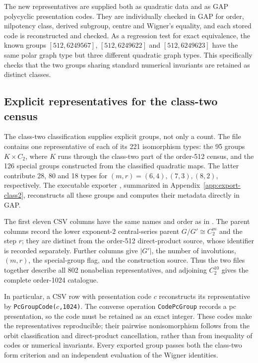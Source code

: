 \documentclass[11pt,a4paper]{amsart}
\theoremstyle{definition}
\theoremstyle{remark}
\numberwithin{equation}{section}
\begin{document}
The new representatives are supplied both as quadratic data and as
GAP polycyclic presentation codes. They are individually checked in
GAP for order, nilpotency class, derived subgroup, centre and
Wigner's equality, and each stored code is reconstructed and checked.
As a regression test for exact equivalence, the known groups
$[512,6249567]$, $[512,6249622]$ and $[512,6249623]$ have the same
polar graph type but three different quadratic graph types. This
specifically checks that the two groups sharing standard numerical
invariants are retained as distinct classes.

\subsection{Explicit representatives for the class-two census}
\label{sec:class2-catalogue}
The class-two classification supplies explicit groups, not only a count.
The file  contains one representative of each of
its 221 isomorphism types: the 95 groups $K\times C_2$, where $K$ runs
through the class-two part of the order-512 census, and the 126 special
groups constructed from the classified quadratic maps.  The latter
contribute 28, 80 and 18 types for $(m,r)=(6,4),(7,3),(8,2)$, respectively.
The executable exporter , summarized in
Appendix~\ref{app:export-class2}, reconstructs all these groups and computes
their metadata directly in GAP.

The first eleven CSV columns have the same names and order as in
.  The parent columns record the lower
exponent-$2$ central-series parent $G/G'\cong C_2^m$ and the step $r$;
they are distinct from the order-512 direct-product source, whose
identifier is recorded separately.  Further columns give $|G'|$, the
number of involutions, $(m,r)$, the special-group flag, and the
construction source.  Thus the two files together describe all 802
nonabelian representatives, and adjoining $C_2^{10}$ gives the complete
order-1024 catalogue.

In particular, a CSV row with presentation code $c$ reconstructs its
representative by \texttt{PcGroupCode($c$,1024)}.  The converse operation
\texttt{CodePcGroup} records a pc presentation, so the code must be
retained as an exact integer.  These codes make the representatives
reproducible; their pairwise nonisomorphism follows from the orbit
classification and direct-product cancellation, rather than from
inequality of codes or numerical invariants.  Every exported group
passes both the class-two form criterion and an independent evaluation
of the Wigner identities.
\end{document}
